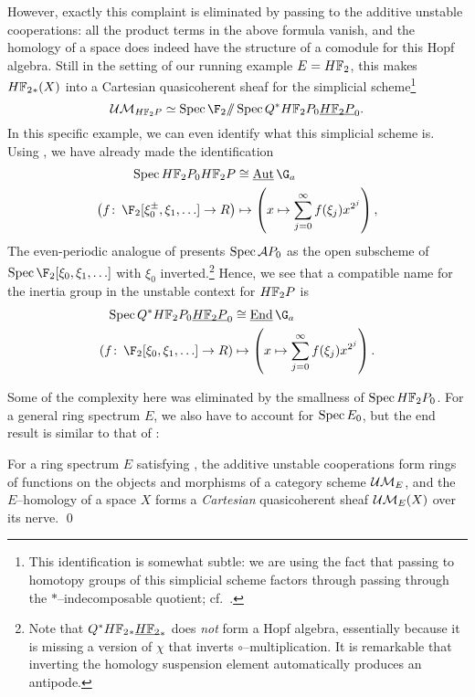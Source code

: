 However, exactly this complaint is eliminated by passing to the additive unstable cooperations: all the product terms in the above formula vanish, and the homology of a space does indeed have the structure of a comodule for this Hopf algebra.  Still in the setting of our running example \(E = \HFtwo\), this makes \(\HFtwo_*(X)\) into a Cartesian quasicoherent sheaf for the simplicial scheme\footnote{This identification is somewhat subtle: we are using the fact that passing to homotopy groups of this simplicial scheme factors through passing through the \(\ast\)--indecomposable quotient; cf.\ .} \[\Ucontext{\HFtwo P} \simeq \Spec \F_2 \mmod \Spec Q^* \HFtwo P_0 \OS{\HFtwo P}{0}.\]  In this specific example, we can even identify what this simplicial scheme is.  Using , we have already made the identification
\begin{align*}
\Spec \HFtwo P_0 \HFtwo P & \cong \InternalAut{\G_a} \\
\left(f\co \F_2[\xi_0^\pm, \xi_1, \ldots] \to R \right) & \mapsto \left(x \mapsto \sum_{j=0}^\infty f(\xi_j) x^{2^j}\right),
\end{align*}
The even-periodic analogue of  presents \(\operatorname{Spec} \mathcal A P_0\) as the open subscheme of \(\Spec \F_2[\xi_0, \xi_1, \ldots]\) with \(\xi_0\) inverted.\footnote{Note that \(Q^* \HFtwo_* \OS{\HFtwo}{*}\) does \emph{not} form a Hopf algebra, essentially because it is missing a version of \(\chi\) that inverts \(\circ\)--multiplication.  It is remarkable that inverting the homology suspension element automatically produces an antipode.}  Hence, we see that a compatible name for the inertia group in the unstable context for \(\HFtwo P\) is
\begin{align*}
\Spec Q^* \HFtwo P_0 \OS{\HFtwo P}{0} & \cong \InternalEnd{\G_a} \\
\left(f\co \F_2[\xi_0, \xi_1, \ldots] \to R \right) & \mapsto \left(x \mapsto \sum_{j=0}^\infty f(\xi_j) x^{2^j}\right).
\end{align*}

Some of the complexity here was eliminated by the smallness of \(\Spec \HFtwo P_0\).  For a general ring spectrum \(E\), we also have to account for \(\operatorname{Spec} E_0\), but the end result is similar to that of :
\begin{lemma}
For a ring spectrum \(E\) satisfying {\UFH}, the additive unstable cooperations form rings of functions on the objects and morphisms of a category scheme \(\mathcal{UM}_{E}\), and the \(E\)--homology of a space \(X\) forms a \emph{Cartesian} quasicoherent sheaf \(\mathcal{UM}_{E}(X)\) over its nerve. \qed
\end{lemma}

